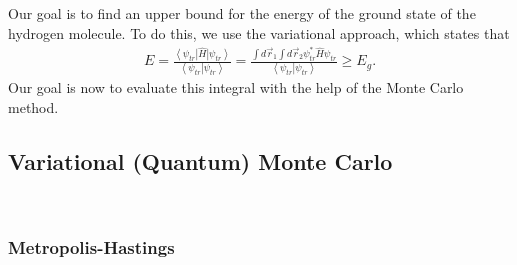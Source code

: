 Our goal is to find an upper bound for the energy of the ground state of the hydrogen molecule. To do this, we use the variational approach, which states that 
\begin{align}
E = \frac{{\left\langle \psi_{tr}  \right|\hat H\left| \psi_{tr}  \right\rangle }}{{\left\langle \psi_{tr}  \right|\left. \psi_{tr}  \right\rangle }} = \frac{{\int {d{{\vec r}_1}\int {d{{\vec r}_2}} {\psi_{tr} ^ * }\hat H\psi_{tr} } }}{{\left\langle \psi_{tr}  \right|\left. \psi_{tr}  \right\rangle }} \ge {E_g}.
\label{eq:main}
\end{align}
Our goal is now to evaluate this integral with the help of the Monte Carlo method. 
\subsection{Variational (Quantum) Monte Carlo}
\\
\subsubsection{Metropolis-Hastings}

